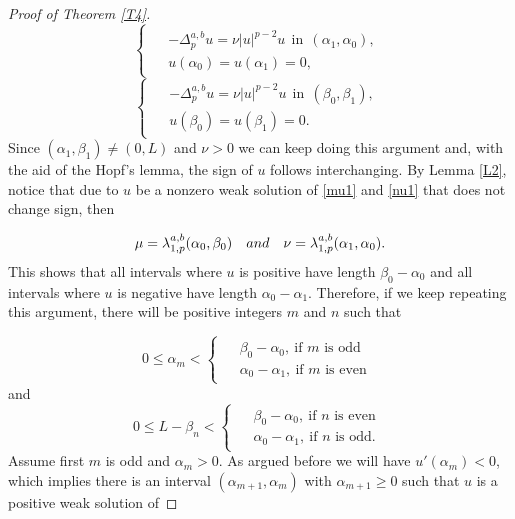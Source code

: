 \documentclass[a4paper,11pt]{article}
\begin{document}
{\begin{proof}[Proof of Theorem \ref{T4}]
\begin{equation}\label{nu1}
\begin{cases}
\begin{aligned}
& - \Delta_{p}^{a,b} u = \nu|u|^{p-2}u \ \ \text{in} \ \ (\alpha_{1},\alpha_{0}), \\
& u(\alpha_{0}) = u(\alpha_{1}) = 0,
\end{aligned}
\end{cases}
\end{equation}
\begin{equation*}
\begin{cases}
\begin{aligned}
& - \Delta_{p}^{a,b} u = \nu|u|^{p-2}u \ \ \text{in} \ \ (\beta_{0},\beta_{1}), \\
& u(\beta_{0}) = u(\beta_{1}) = 0.
\end{aligned}
\end{cases}
\end{equation*}
Since $(\alpha_{1},\beta_{1}) \neq (0,L)$ and $\nu > 0$ we can keep doing this argument and, with the aid of the Hopf's lemma, the sign of $u$ follows interchanging. By Lemma \ref{L2}, notice that due to $u$ be a nonzero weak solution of \eqref{mu1} and \eqref{nu1} that does not change sign, then

\[
\mu = \lambda_{1,p}^{a,b}(\alpha_{0},\beta_{0})\ \ \ {\rm and}\ \ \ \nu = \lambda_{1,p}^{a,b}(\alpha_{1},\alpha_{0}).
\]
This shows that all intervals where $u$ is positive have length $\beta_{0}-\alpha_{0}$ and all intervals where $u$ is negative have length $\alpha_{0}-\alpha_{1}$. Therefore, if we keep repeating this argument, there will be positive integers $m$ and $n$ such that

\[
0 \leq \alpha_{m} < \begin{cases}
\begin{aligned}
& \beta_{0}-\alpha_{0}, \ \text{if $m$ is odd} \\
& \alpha_{0}-\alpha_{1}, \ \text{if $m$ is even}
\end{aligned}
\end{cases}
\]
and
\[
0 \leq L-\beta_{n} < \begin{cases}
\begin{aligned}
& \beta_{0}-\alpha_{0}, \ \text{if $n$ is even} \\
& \alpha_{0}-\alpha_{1}, \ \text{if $n$ is odd}.
\end{aligned}
\end{cases}
\]
Assume first $m$ is odd and $\alpha_{m} > 0$. As argued before we will have $u'(\alpha_{m}) < 0$, which implies there is an interval $(\alpha_{m+1},\alpha_{m})$ with $\alpha_{m+1} \geq 0$ such that $u$ is a positive weak solution of


\end{proof}}
\end{document}
